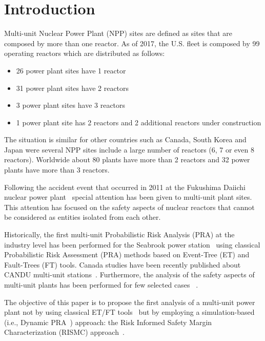 \section{Introduction}
\label{sec:introduction}

Multi-unit Nuclear Power Plant (NPP) sites are defined as sites that are composed by 
more than one reactor. As of 2017, the U.S. fleet is composed by 99 operating reactors
which are distributed as follows:
\begin{itemize}
  \item 26 power plant sites have 1 reactor
  \item 31 power plant sites have 2 reactors
  \item 3 power plant sites have 3 reactors
  \item 1 power plant site has 2 reactors and 2 additional reactors under construction
\end{itemize}
The situation is similar for other countries such as Canada, South Korea and Japan were 
several NPP sites include a large number of reactors (6, 7 or even 8 reactors). 
Worldwide about 80 plants have more than 2 reactors and 32 power plants have more 
than 3 reactors. 

Following the accident event that occurred in 2011 at the Fukushima Daiichi nuclear 
power plant~\cite{Fukushima} special 
attention has been given to multi-unit plant sites. This attention has focused on the 
safety aspects of nuclear reactors that cannot be considered as entities isolated 
from each other. 

Historically, the first multi-unit Probabilistic Risk Analysis (PRA) at the industry
level has been performed for the Seabrook power station~\cite{Seabrook_MU_PRA} using 
classical Probabilistic Risk Assessment (PRA) methods based on Event-Tree (ET) and 
Fault-Trees (FT) tools.
Canada studies have been recently published about CANDU multi-unit 
stations~\cite{CANDU_MU_PRA,Darlington_MU_PRA}.
Furthermore, the analysis of the safety aspects of multi-unit plants has been performed 
for few selected cases ~\cite{MultiUnitKumara,MultiUnitModarres,MultiUnitZhang}. 

The objective of this paper is to propose the first analysis of a multi-unit power 
plant not by using classical ET/FT tools~\cite{Nureg1150} but by employing a simulation-based 
(i.e., Dynamic PRA~\cite{DynamicReliabilityMonteCarlo}) approach: 
the Risk Informed Safety Margin Characterization (RISMC) approach~\cite{RISMC,mandelliNewAlgo}. 


